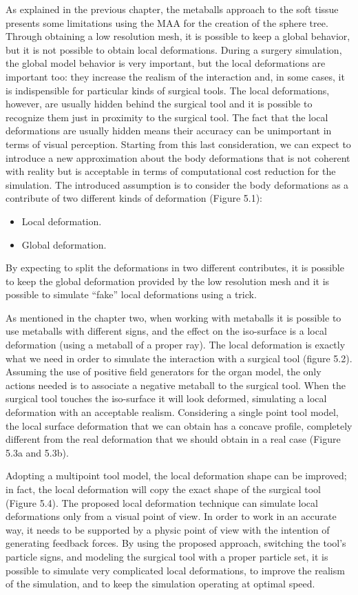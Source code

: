 \documentclass[journal]{vgtc}                %
\begin{document}
As explained in the previous chapter, the metaballs approach to the soft tissue
presents some limitations using the MAA for the creation of the sphere tree. Through
obtaining a low resolution mesh, it is possible to keep a global behavior, but it is not
possible to obtain local deformations. During a surgery simulation, the global model
behavior is very important, but the local deformations are important too: they
increase the realism of the interaction and, in some cases, it is indispensible for
particular kinds of surgical tools. The local deformations, however, are usually
hidden behind the surgical tool and it is possible to recognize them just in proximity
to the surgical tool. The fact that the local deformations are usually hidden means their accuracy can be unimportant in terms of visual perception. Starting from this last consideration, we can expect to introduce a new approximation about the body
deformations that is not coherent with reality but is acceptable in terms of
computational cost reduction for the simulation. The introduced assumption is to
consider the body deformations as a contribute of two different kinds of deformation
(Figure 5.1):
\begin{itemize}
\item Local deformation.
\item Global deformation.
\end{itemize}
By expecting to split the deformations in two different contributes, it is possible to
keep the global deformation provided by the low resolution mesh and it is possible to
simulate “fake” local deformations using a trick.

As mentioned in the chapter two, when working with metaballs it is possible to use
metaballs with different signs, and the effect on the iso-surface is a local deformation
(using a metaball of a proper ray). The local deformation is exactly what we need in
order to simulate the interaction with a surgical tool (figure 5.2). Assuming the use of
positive field generators for the organ model, the only actions needed is to associate a
negative metaball to the surgical tool. When the surgical tool touches the iso-surface
it will look deformed, simulating a local deformation with an acceptable realism. Considering a single point tool model, the local surface deformation that we can obtain has a concave profile, completely different from the real deformation that we
should obtain in a real case (Figure 5.3a and 5.3b).

Adopting a multipoint tool model, the local deformation shape can be improved; in
fact, the local deformation will copy the exact shape of the surgical tool (Figure 5.4). The proposed local deformation technique can simulate local deformations only from a visual point of view. In order to work in an accurate way, it needs to be supported
by a physic point of view with the intention of generating feedback forces. By using
the proposed approach, switching the tool’s particle signs, and modeling the surgical
tool with a proper particle set, it is possible to simulate very complicated local
deformations, to improve the realism of the simulation, and to keep the simulation
operating at optimal speed.
\end{document}
